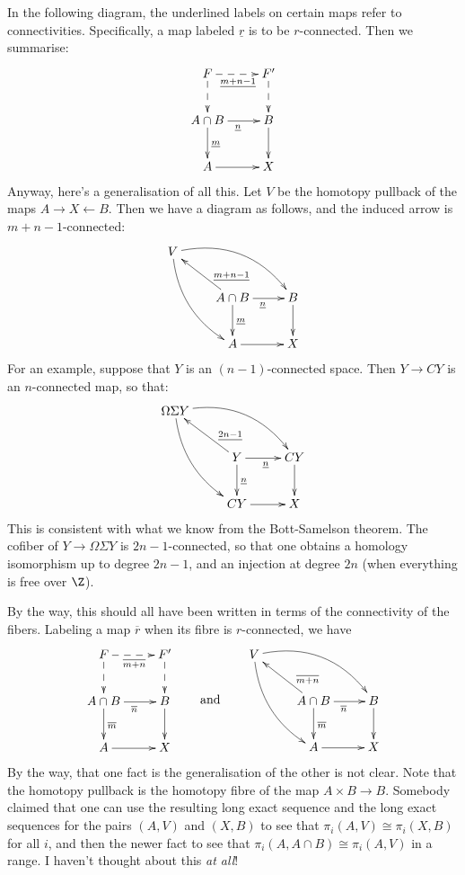 \documentclass[11pt]{article}
\begin{document}
In the following diagram, the underlined labels on certain maps refer to
connectivities. Specifically, a map labeled $\underline r$ is to be
$r$-connected. Then we summarise:
\[\xymatrix{
F\ar@{-->}[r]_{\underline{m+n-1}}\ar@{-->}[d]&F'\ar@{-->}[d]\\
A\cap B\ar[d]^{\underline{m}}\ar[r]_{\underline{{n}}}&B\ar[d]\\
A\ar[r]&X
}\]
Anyway, here's a generalisation of all this. Let $V$ be the homotopy pullback of
the maps $A\rightarrow X\leftarrow B$. Then we have a diagram as follows, and
the induced arrow is $m+n-1$-connected:
\[\xymatrix{
V\ar@/_1pc/[ddr]\ar@/^1.5pc/[rrd]\\
&A\cap B\ar[ul]_(.3){\underline{m+n-1}}\ar[d]^{\underline{m}}
\ar[r]_{\underline{{n}}}&B\ar[d]\\
&A\ar[r]&X
}\]
For an example, suppose that $Y$ is an $(n-1)$-connected space. Then $Y\to CY$
is an $n$-connected map, so that:
\[\xymatrix{
\Omega\Sigma Y\ar@/_1pc/[ddr]\ar@/^1.5pc/[rrd]\\
&Y\ar[ul]_(.3){\underline{2n-1}}\ar[d]^{\underline{n}}
\ar[r]_{\underline{{n}}}&CY\ar[d]\\
&CY\ar[r]&X
}\]
This is consistent with what we know from the Bott-Samelson theorem. The cofiber
of $Y\to \Omega\Sigma Y$ is $2n-1$-connected, so that one obtains a homology
isomorphism up to degree $2n-1$, and an injection at degree $2n$ (when
everything is free over $\Z$).

By the way, this should all have been written in terms of the connectivity of
the fibers. Labeling a map $\overline r$ when its fibre is $r$-connected, we
have
\[
\xymatrix{
F\ar@{-->}[r]_{\overline{m+n}}\ar@{-->}[d]&F'\ar@{-->}[d]\\
A\cap B\ar[d]^{\overline{m}}\ar[r]_{\overline{{n}}}&B\ar[d]\\
A\ar[r]&X
}\raisebox{-1.26cm}{\qquad and\qquad }\xymatrix{
V\ar@/_1pc/[ddr]\ar@/^1.5pc/[rrd]\\
&A\cap B\ar[ul]_(.3){\overline{m+n}}\ar[d]^{\overline{m}}
\ar[r]_{\overline{{n}}}&B\ar[d]\\
&A\ar[r]&X
}\]
By the way, that one fact is the generalisation of the other is not clear. Note
that the homotopy pullback is the homotopy fibre of the map $A\times B\to B$.
Somebody claimed that one can use the resulting long exact sequence and the long
exact sequences for the pairs $(A,V)$ and $(X,B)$ to see that
$\pi_i(A,V)\cong\pi_i(X,B)$ for all $i$, and then the newer fact to see that
$\pi_i(A,A\cap B)\cong\pi_i(A,V)$ in a range. I haven't thought about this
\emph{at all}!
\end{document}
